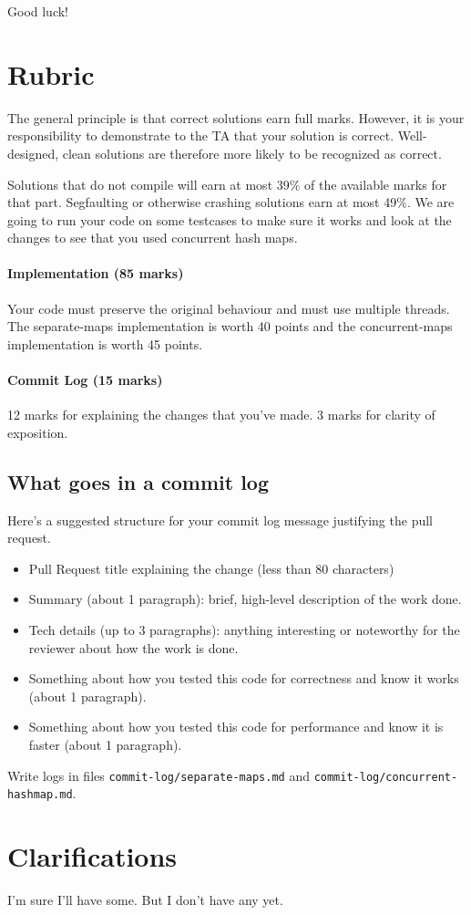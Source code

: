 \documentclass[12pt]{article}
\renewcommand{\_}{\kern-1.5pt\textunderscore\kern-1.5pt}
\begin{document}
Good luck!

\section*{Rubric}
The general principle is that correct solutions earn full marks. However, it is your responsibility to demonstrate to the TA that your solution is correct. Well-designed, clean solutions are therefore more likely to be recognized as correct. \par

Solutions that do not compile will earn at most 39$\%$  of the available marks for that part. Segfaulting or otherwise crashing solutions earn at most 49$\%$. We are going to run your code on some testcases to make sure it works and look at the changes to see that you used concurrent hash maps.

\paragraph{Implementation (85 marks)} Your code must preserve the original behaviour and must use multiple threads. The separate-maps implementation is worth 40 points and the concurrent-maps implementation is worth 45 points.

\paragraph{Commit Log (15 marks)} 12 marks for explaining the changes that you've made. 3 marks for clarity of exposition. 

\subsection*{What goes in a commit log}
Here's a suggested structure for your commit log message justifying the pull request.
\begin{itemize}
\item Pull Request title explaining the change (less than 80 characters)
\item Summary (about 1 paragraph): brief, high-level description of the work done.
\item Tech details (up to 3 paragraphs): anything interesting or noteworthy for the reviewer about how the work is done. 
\item Something about how you tested this code for correctness and know it works (about 1 paragraph).
\item Something about how you tested this code for performance and know it is faster (about 1 paragraph).
\end{itemize}
Write logs in files {\tt commit-log/separate-maps.md} and {\tt commit-log/concurrent-hashmap.md}.

\section*{Clarifications}
I'm sure I'll have some. But I don't have any yet.



\end{document}

